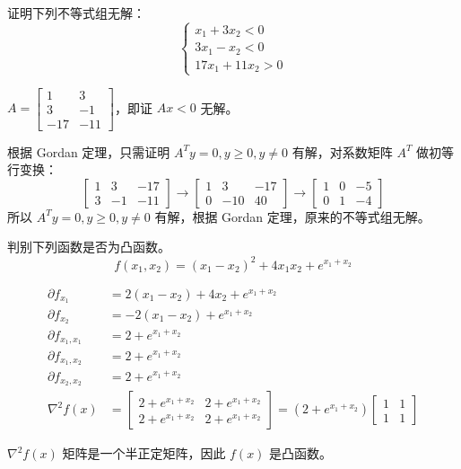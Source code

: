 \begin{problem}
    证明下列不等式组无解：
    \[\begin{cases}
        x_1 + 3x_2 < 0 \\
        3x_1 - x_2 < 0 \\
        17x_1 + 11x_2 > 0
    \end{cases}\]
\end{problem}
\begin{solution}
    $A = \begin{bmatrix}
        1 & 3\\
        3 & -1\\
        -17 & -11
    \end{bmatrix}$，即证 $Ax < 0$ 无解。

    根据 Gordan 定理，只需证明 $A^Ty = 0, y \ge 0, y \neq 0$ 有解，对系数矩阵 $A^T$ 做初等行变换：
    \[\begin{bmatrix}
        1 & 3 & -17\\
        3 & -1 & -11
    \end{bmatrix} \longrightarrow \begin{bmatrix}
        1 & 3 & -17\\
        0 & -10 & 40
    \end{bmatrix} \longrightarrow \begin{bmatrix}
        1 & 0 & -5\\
        0 & 1 & -4
    \end{bmatrix}\]
    所以 $A^Ty = 0, y\ge 0, y \neq 0$ 有解，根据 Gordan 定理，原来的不等式组无解。
\end{solution}

\begin{problem}
    判别下列函数是否为凸函数。
    \[f(x_1, x_2) = (x_1 - x_2)^2 + 4x_1x_2 + e^{x_1 + x_2}\]
\end{problem}
\begin{solution}
    \begin{align*}
        \partial f_{x_1} &= 2(x_1 - x_2) + 4x_2 + e^{x_1 + x_2}\\
        \partial f_{x_2} &= -2(x_1 - x_2) + e^{x_1 + x_2}\\
        \partial f_{x_1, x_1} &= 2 + e^{x_1 + x_2}\\
        \partial f_{x_1, x_2} &= 2 + e^{x_1 + x_2}\\
        \partial f_{x_2, x_2} &= 2 + e^{x_1 + x_2}\\
        \nabla^2f(x) &= \begin{bmatrix}
            2 + e^{x_1 + x_2} & 2 + e^{x_1 + x_2}\\
            2 + e^{x_1 + x_2} & 2 + e^{x_1 + x_2}
        \end{bmatrix} = (2 + e^{x_1 + x_2}) \begin{bmatrix}
            1 & 1\\
            1 & 1
        \end{bmatrix}
    \end{align*}

    $\nabla^2f(x)$ 矩阵是一个半正定矩阵，因此 $f(x)$ 是凸函数。

    
\end{solution}

